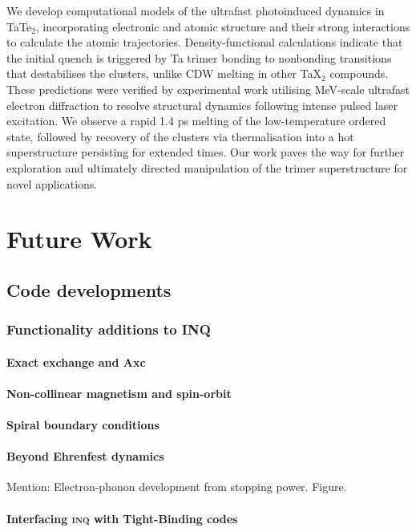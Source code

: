 We develop computational models of the ultrafast photoinduced dynamics in TaTe$_2$, incorporating  electronic and atomic structure and their strong interactions to calculate the atomic trajectories. Density-functional calculations indicate that the initial quench is triggered by Ta trimer bonding to nonbonding transitions that destabilises the clusters, unlike CDW melting in other TaX$_2$ compounds. These predictions were verified by experimental work utilising MeV-scale ultrafast electron diffraction to resolve structural dynamics following intense pulsed laser excitation. We observe a rapid 1.4 ps melting of the low-temperature ordered state, followed by recovery of the clusters via thermalisation into a hot superstructure persisting for extended times.  Our work paves the way for further exploration and ultimately directed manipulation of the trimer superstructure for novel applications.



\section{Future Work}
\subsection{Code developments}
\subsubsection{Functionality additions to INQ}
\paragraph{Exact exchange and Axc}
\paragraph{Non-collinear magnetism and spin-orbit}
\paragraph{Spiral boundary conditions}

\paragraph{Beyond Ehrenfest dynamics} 
Mention: Electron-phonon development from stopping power.  Figure.

\paragraph{Interfacing \textsc{inq} with Tight-Binding codes}

